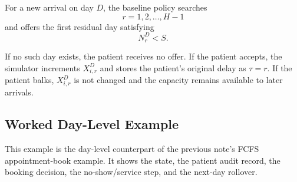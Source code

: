 \documentclass[11pt]{article}
\begin{document}
For a new arrival on day \(D\), the baseline policy searches
\[
r=1,2,\dots,H-1
\]
and offers the first residual day satisfying
\[
N_r^D<S.
\]

If no such day exists, the patient receives no offer. If the patient accepts, the simulator
increments \(X_{i,r}^{D}\) and stores the patient's original delay as \(\tau=r\). If the patient
balks, \(X_{i,r}^{D}\) is not changed and the capacity remains available to later arrivals.

\subsection{Worked Day-Level Example}

This example is the day-level counterpart of the previous note's FCFS appointment-book example.
It shows the state, the patient audit record, the booking decision, the no-show/service step, and
the next-day rollover.
\end{document}
